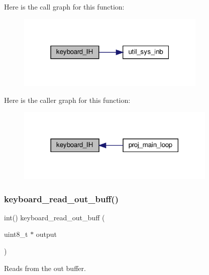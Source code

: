 Here is the call graph for this function\+:\nopagebreak
\begin{figure}[H]
\begin{center}
\leavevmode
\includegraphics[width=256pt]{group__keyboard_gabb14446976ac2fcfaf095866f58d28ce_cgraph}
\end{center}
\end{figure}
Here is the caller graph for this function\+:\nopagebreak
\begin{figure}[H]
\begin{center}
\leavevmode
\includegraphics[width=270pt]{group__keyboard_gabb14446976ac2fcfaf095866f58d28ce_icgraph}
\end{center}
\end{figure}
\mbox{\label{group__keyboard_ga01f4a2303581946d7d26fdb5ac7c0caf}} 
\subsubsection{\texorpdfstring{keyboard\+\_\+read\+\_\+out\+\_\+buff()}{keyboard\_read\_out\_buff()}}
{\footnotesize\ttfamily int() keyboard\+\_\+read\+\_\+out\+\_\+buff (\begin{DoxyParamCaption}\item[{uint8\+\_\+t $\ast$}]{output }\end{DoxyParamCaption})}



Reads from the out buffer. 


